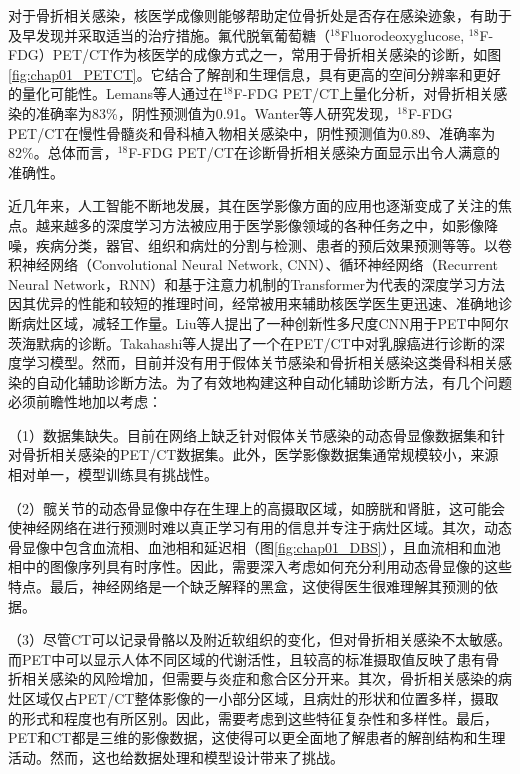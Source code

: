 对于骨折相关感染，核医学成像则能够帮助定位骨折处是否存在感染迹象，有助于及早发现并采取适当的治疗措施。氟代脱氧葡萄糖（\(^{18}\)Fluorodeoxyglucose, \(^{18}\)F-FDG）PET/CT作为核医学的成像方式之一，常用于骨折相关感染的诊断\cite{zhang2021comparative}，如图\ref{fig:chap01_PETCT}。它结合了解剖和生理信息，具有更高的空间分辨率和更好的量化可能性\cite{gholamrezanezhad2018clinical}。Lemans等人\cite{lemans2019diagnostic}通过在\(^{18}\)F-FDG PET/CT上量化分析，对骨折相关感染的准确率为83\%，阴性预测值为0.91。Wanter等人\cite{wenter2016diagnostic}研究发现，\(^{18}\)F-FDG PET/CT在慢性骨髓炎和骨科植入物相关感染中，阴性预测值为0.89、准确率为82\%。总体而言，\(^{18}\)F-FDG PET/CT在诊断骨折相关感染方面显示出令人满意的准确性。

近几年来，人工智能不断地发展，其在医学影像方面的应用也逐渐变成了关注的焦点。越来越多的深度学习方法被应用于医学影像领域的各种任务之中，如影像降噪，疾病分类，器官、组织和病灶的分割与检测、患者的预后效果预测等等\cite{ZSZD202307032,YJTY202304021}。以卷积神经网络（Convolutional Neural Network, CNN）、循环神经网络（Recurrent Neural Network，RNN）和基于注意力机制的Transformer为代表的深度学习方法因其优异的性能和较短的推理时间，经常被用来辅助核医学医生更迅速、准确地诊断病灶区域，减轻工作量。Liu等人\cite{liu2022diagnosis}提出了一种创新性多尺度CNN用于PET中阿尔茨海默病的诊断。Takahashi等人\cite{takahashi2022deep}提出了一个在PET/CT中对乳腺癌进行诊断的深度学习模型。然而，目前并没有用于假体关节感染和骨折相关感染这类骨科相关感染的自动化辅助诊断方法。为了有效地构建这种自动化辅助诊断方法，有几个问题必须前瞻性地加以考虑：

（1）数据集缺失。目前在网络上缺乏针对假体关节感染的动态骨显像数据集和针对骨折相关感染的PET/CT数据集。此外，医学影像数据集通常规模较小，来源相对单一，模型训练具有挑战性。

（2）髋关节的动态骨显像中存在生理上的高摄取区域，如膀胱和肾脏，这可能会使神经网络在进行预测时难以真正学习有用的信息并专注于病灶区域。其次，动态骨显像中包含血流相、血池相和延迟相（图\ref{fig:chap01_DBS}），且血流相和血池相中的图像序列具有时序性。因此，需要深入考虑如何充分利用动态骨显像的这些特点。最后，神经网络是一个缺乏解释的黑盒，这使得医生很难理解其预测的依据。

（3）尽管CT可以记录骨骼以及附近软组织的变化，但对骨折相关感染不太敏感。而PET中可以显示人体不同区域的代谢活性，且较高的标准摄取值反映了患有骨折相关感染的风险增加，但需要与炎症和愈合区分开来。其次，骨折相关感染的病灶区域仅占PET/CT整体影像的一小部分区域，且病灶的形状和位置多样，摄取的形式和程度也有所区别。因此，需要考虑到这些特征复杂性和多样性。最后，PET和CT都是三维的影像数据，这使得可以更全面地了解患者的解剖结构和生理活动。然而，这也给数据处理和模型设计带来了挑战。

